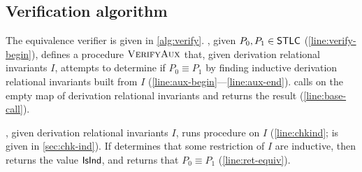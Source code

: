 \subsection{Verification algorithm}
\label{sec:verifier}
\begin{algorithm}[t]
  {  \label{line:aux-end} %
    \Return{$\verifyaux(\emptyset)$} \label{line:base-call} } %
  \caption{%
    \verify: given $P_0, P_1 \in \stlc$, decides if $P_0 \equiv P_1$.
    \verify uses procedures \mergeinvs (\autoref{sec:verifier}), %
    \chkinductive (\autoref{sec:chk-ind}), and %
    \verifyders (\autoref{sec:verify-ders}).
  }
  \label{alg:verify}
\end{algorithm}
The equivalence verifier \verify is given in \autoref{alg:verify}.
%
\verify, given $P_0, P_1 \in \stlc$ (\autoref{line:verify-begin}),
defines a procedure $\textsc{VerifyAux}$ that, given derivation relational
invariants $I$, attempts to determine if $P_0 \equiv P_1$ by finding
inductive derivation relational invariants built from $I$
(\autoref{line:aux-begin}---\autoref{line:aux-end}).
%
\verify calls \verifyaux on the empty map of derivation relational
invariants and returns the result (\autoref{line:base-call}).

\verifyaux, given derivation relational invariants $I$, runs procedure
\chkinductive on $I$ (\autoref{line:chkind}; \chkinductive is given in
\autoref{sec:chk-ind}).
%
If \chkinductive determines that some restriction of $I$ are
inductive, then \chkinductive returns the value $\mathsf{IsInd}$, and
\verifyaux returns that $P_0 \equiv P_1$ (\autoref{line:ret-equiv}).

